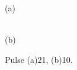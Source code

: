  
\begin{figure}[h!]
\begin{minipage}[h]{0.5\linewidth}
 (a) \\
\end{minipage}
\hfill
\begin{minipage}[h]{0.5\linewidth}
 \\(b)
\end{minipage}
\caption{Pulse (a)21, (b)10.}
\label{fig:Pulse_21_10}
\end{figure}





